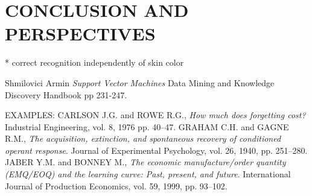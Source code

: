 \documentclass[11pt,a4paper]{article}
\begin{document}
\section{CONCLUSION AND PERSPECTIVES}


* correct recognition independently of skin color


\begin{thebibliography}{99}
 \setlength\baselineskip{5pt}
%
 Shmilovici Armin \textit{Support Vector Machines} Data Mining and Knowledge Discovery Handbook pp 231-247.




EXAMPLES:
 CARLSON J.G. and ROWE R.G., \textit{How much does forgetting cost?} Industrial Engineering, vol. 8, 1976 pp. 40--47.
 GRAHAM C.H. and  GAGNE R.M., \textit{The acquisition, extinction, and spontaneous recovery of conditioned operant response}. Journal of Experimental Psychology, vol. 26, 1940, pp. 251--280.
 JABER Y.M. and BONNEY M., \textit{The economic manufacture/order quantity (EMQ/EOQ) and the learning curve: Past, present, and future}. International Journal of Production Economics, vol. 59, 1999, pp. 93--102.


\end{thebibliography}
\end{document}
